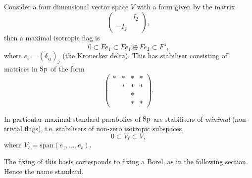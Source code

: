 \begin{example}
        Consider a four dimensional vector space \(V\) with a form given by the matrix
        \[\begin{pmatrix}
            & I_2 \\
            -I_2 & 
        \end{pmatrix},\]
        then a maximal isotropic flag is 
        \[0 \subset Fe_1 \subset Fe_1 \oplus Fe_2 \subset F^4,\]
        where \(e_i = (\delta_{ij})_j\) (the Kronecker delta). This has stabiliser consisting of matrices in \(\operatorname{Sp}\) of the form
        \[\begin{pmatrix}
            *&*&*&* \\
             &*&*&* \\
             && *& \\
             && *& *
        \end{pmatrix}.\]
    \end{example}

\vspace{5mm}
    \label{maximal_parabolic}
    In particular maximal standard parabolics of \(\operatorname{Sp}\) are stabilisers of \textit{minimal} (non-trivial flags), i.e. stabilisers of non-zero isotropic subspaces,
    \[0 \subset V_\ell \subset V,\]
    where \(V_\ell = \mathrm{span}(e_1, ..., e_\ell)\). 
    \begin{remark}
    	The fixing of this basis corresponds to fixing a Borel, as in the following section. Hence the name standard.
    \end{remark}
    
